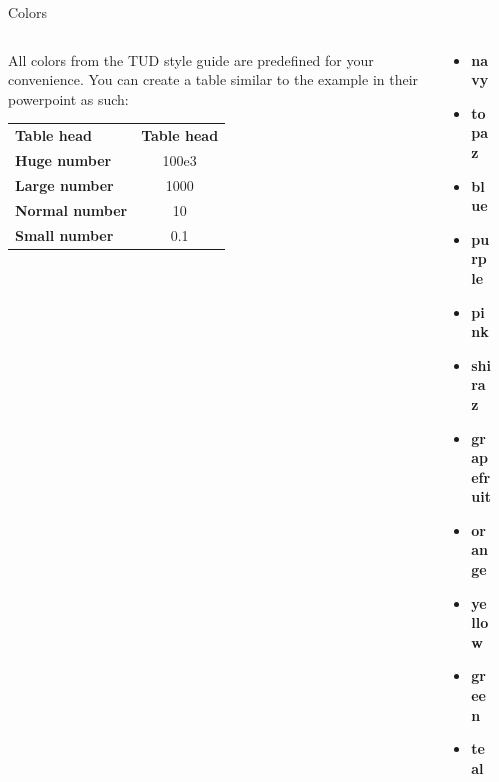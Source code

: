 \documentclass[t, aspectratio=169, english, table]{_style/tudelft-beamer}
\begin{document}
\begin{frame}[t]{Colors}
  \begin{columns}[T, onlytextwidth]
    \begin{column}{0.5\textwidth}
      All colors from the TUD style guide are predefined for your convenience.
      You can create a table similar to the example in their powerpoint as such:\\[1ex]
      
      \renewcommand{\arraystretch}{1.4}
      \newcommand{\thead}{\color{white}\bfseries} %
      \begin{tabular}{>{\color{primary}\bfseries}l|S}
        \thead Table head & {\thead Table head} \\
        Huge number & 100e3 \\
        Large number & 1000\\
        Normal number & 10\\
        Small number & 0.1\\
      \end{tabular}
    \end{column}
    \begin{column}{0.25\textwidth}
      \begin{itemize}
        \item \textcolor{tud navy}{\textbf{navy}}
        \item \textcolor{tud topaz}{\textbf{topaz}}
        \item \textcolor{tud blue}{\textbf{blue}}
        \item \textcolor{tud purple}{\textbf{purple}}
        \item \textcolor{tud pink}{\textbf{pink}}
        \item \textcolor{tud shiraz}{\textbf{shiraz}}
        \item \textcolor{tud grapefruit}{\textbf{grapefruit}}
        \item \textcolor{tud orange}{\textbf{orange}}
        \item \textcolor{tud yellow}{\textbf{yellow}}
        \item \textcolor{tud green}{\textbf{green}}
        \item \textcolor{tud teal}{\textbf{teal}}
      \end{itemize}
    \end{column}
    \begin{column}{0.25\textwidth}
      \begin{itemize}

\end{itemize}
\end{column}
\end{columns}
\end{frame}
\end{document}
